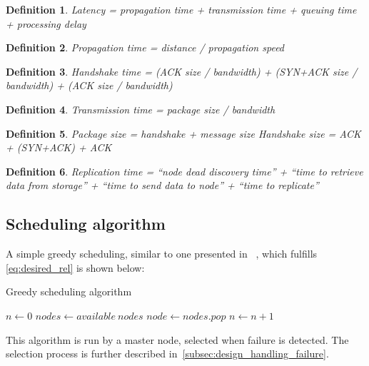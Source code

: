 \documentclass{cslthse-msc}
\newtheorem{definition}{Definition}[chapter]
\begin{document}
\begin{definition}
Latency = propagation time + transmission time + queuing time + processing delay
\end{definition}

\begin{definition}
Propagation time = distance / propagation speed
\end{definition}

\begin{definition}
Handshake time = (ACK size / bandwidth) + (SYN+ACK size / bandwidth) + (ACK size / bandwidth)	
\end{definition}

\begin{definition}
Transmission time = package size / bandwidth
\end{definition}

\begin{definition}
Package size = handshake + message size
Handshake size = ACK + (SYN+ACK) + ACK
\end{definition}

\begin{definition}
Replication time = “node dead discovery time” + “time to retrieve data from storage” + “time to send data to node” + “time to replicate”
\end{definition}

\subsection{Scheduling algorithm} \label{subsec:design_sched_alg}
A simple greedy scheduling, similar to one presented in ~\cite{effTaskReplMobGrid}, which fulfills \cref{eq:desired_rel} is shown below:

\begin{algorithm} 
	\caption{Greedy scheduling algorithm} \label{alg:scheduling}
	\begin{algorithmic}[1]
	\State $n\gets 0$
	\State $nodes\gets available\ nodes$
		\State $node\gets nodes.pop$
		\State
		\State $n\gets n + 1$
	\EndWhile
	\end{algorithmic}
\end{algorithm}

This algorithm is run by a master node, selected when failure is detected. The selection process is further described in~\cref{subsec:design_handling_failure}.
\end{document}
